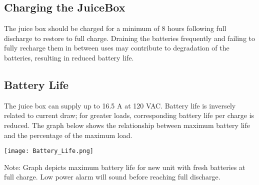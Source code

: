 \documentclass[../jb_user_manual.tex]{subfiles}
\begin{document}
\subsection{Charging the JuiceBox}

The juice box should be charged for a minimum of 8 hours following full discharge to restore to full charge.  Draining the batteries frequently and failing to fully recharge them in between uses may contribute to degradation of the batteries, resulting in reduced battery life.

\subsection{Battery Life}

 The juice box can supply up to 16.5 A at 120 VAC.  Battery life is inversely related to current draw; for greater loads, corresponding battery life per charge is reduced.  The graph below shows the relationship between maximum battery life and the percentage of the maximum load.

\vspace{3mm}
\texttt{[image: Battery\_Life.png]}

Note:  Graph depicts maximum battery life for new unit with fresh batteries at full charge.  Low power alarm will sound before reaching full discharge.
\end{document}
